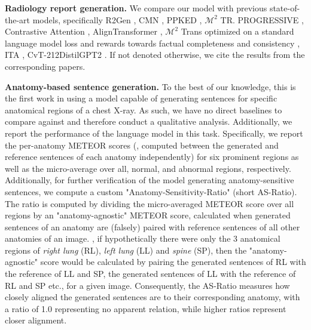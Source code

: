 \documentclass[10pt,twocolumn,letterpaper]{article}
\begin{document}
\begin{table*}[t!]
{\begin{tabular}{lllllll||lll}
		\end{tabular}
	}
	\caption{Clinical efficacy (CE) metrics micro-averaged over 5 observations (denoted by mic-5) and example-based averaged over 14 observations (denoted by ex-14). RL represents reinforcement learning. Our model outperforms all non-RL models by large margins and is competitive with the two RL-based models directly optimized on CE metrics. Dashed lines highlight the scores of the best non-RL baseline. Micro-averaged results of R2Gen cited from \cite{miura2021improving}, all example-based results are cited from \cite{nicolson2022improving}.}
	\label{tab:CE-metrics-total}
\end{table*}



\noindent\textbf{Radiology report generation.} We compare our model with previous state-of-the-art models, specifically R2Gen \cite{chen2020generating}, CMN \cite{chen2021cross}, PPKED \cite{liu2021exploring}, $\mathcal{M}^{2}$ TR. PROGRESSIVE \cite{nooralahzadeh2021progressive}, Contrastive Attention \cite{liu2021contrastive}, AlignTransformer \cite{you2021aligntransformer}, $\mathcal{M}^{2}$ Trans \cite{cornia2020meshed} optimized on a standard language model loss and rewards towards factual completeness and consistency \cite{miura2021improving}, ITA \cite{wang2022inclusive}, CvT-21{\large 2}DistilGPT2 \cite{nicolson2022improving}. If not denoted otherwise, we cite the results from the corresponding papers.

\noindent\textbf{Anatomy-based sentence generation.} To the best of our knowledge, this is the first work in using a model capable of generating sentences for specific anatomical regions of a chest X-ray. As such, we have no direct baselines to compare against and therefore conduct a qualitative analysis. Additionally, we report the performance of the language model in this task. Specifically, we report the per-anatomy METEOR scores (\ie, computed between the generated and reference sentences of each anatomy independently) for six prominent regions as well as the micro-average over all, normal, and abnormal regions, respectively. Additionally, for further verification of the model generating anatomy-sensitive sentences, we compute a custom "Anatomy-Sensitivity-Ratio" (short AS-Ratio). The ratio is computed by dividing the micro-averaged METEOR score over all regions by an "anatomy-agnostic" METEOR score, calculated when generated sentences of an anatomy are (falsely) paired with reference sentences of all other anatomies of an image. \Eg, if hypothetically there were only the 3 anatomical regions of \emph{right lung} (RL), \emph{left lung} (LL) and \emph{spine} (SP), then the "anatomy-agnostic" score would be calculated by pairing the generated sentences of RL with the reference of LL and SP, the generated sentences of LL with the reference of RL and SP etc., for a given image. Consequently, the AS-Ratio measures how closely aligned the generated sentences are to their corresponding anatomy, with a ratio of 1.0 representing no apparent relation, while higher ratios represent closer alignment.
\end{document}
